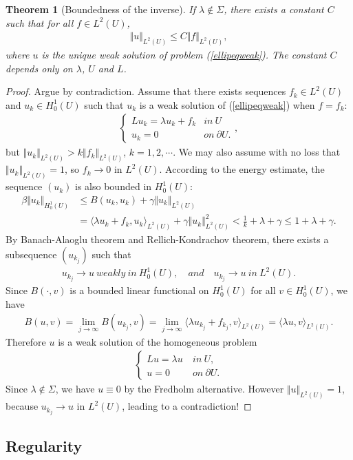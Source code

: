 \documentclass{article}
\numberwithin{equation}{section}
\theoremstyle{plain}
\newtheorem{theorem}{Theorem}[section]
\theoremstyle{definition}
\begin{document}
\begin{theorem}[Boundedness of the inverse]
If $\lambda\notin\Sigma$, there exists a constant $C$ such that for all $f\in L^2(U)$,
\begin{align*}
	\Vert u\Vert_{L^2(U)}\leq C\Vert f\Vert_{L^2(U)},
\end{align*}
where $u$ is the unique weak solution of problem (\ref{ellipeqweak}). The constant $C$ depends only on $\lambda$, $U$ and $L$.
\end{theorem}
\begin{proof}
Argue by contradiction. Assume that there exists sequences $f_k\in L^2(U)$ and $u_k\in H_0^1(U)$ such that $u_k$ is a weak solution of (\ref{ellipeqweak}) when $f=f_k$:
\begin{align*}
	\begin{cases}
		Lu_k=\lambda u_k+f_k & in\ U\\
		u_k=0 & on\ \partial U.
	\end{cases},
\end{align*}
but $\Vert u_k\Vert_{L^2(U)}>k\Vert f_k\Vert_{L^2(U)}$, $k=1,2,\cdots$. We may also assume with no loss that $\Vert u_k\Vert_{L^2(U)}=1$, so $f_k\to 0$ in $L^2(U)$. According to the energy estimate, the sequence $(u_k)$ is also bounded in $H_0^1(U)$:
\begin{align*}
	\beta\Vert u_k\Vert_{H_0^1(U)}&\leq B(u_k,u_k)+\gamma\Vert u_k\Vert_{L^2(U)}\\
	&=\langle \lambda u_k+f_k,u_k\rangle_{L^2(U)}+\gamma\Vert u_k\Vert_{L^2(U)}^2<\frac{1}{k}+\lambda+\gamma\leq 1+\lambda+\gamma.
\end{align*}
By Banach-Alaoglu theorem and Rellich-Kondrachov theorem, there exists a subsequence $(u_{k_j})$ such that
\begin{align*}
	u_{k_j}\to u\ weakly\ in\ H_0^1(U),\quad and\quad u_{k_j}\to u\ in\ L^2(U).
\end{align*} 
Since $B(\cdot,v)$ is a bounded linear functional on $H_0^1(U)$ for all $v\in H_0^1(U)$, we have
\begin{align*}
	B(u,v)=\lim_{j\to\infty} B(u_{k_j},v)=\lim_{j\to\infty}\langle\lambda u_{k_j}+f_{k_j},v\rangle_{L^2(U)}=\langle\lambda u,v\rangle_{L^2(U)}.
\end{align*}
Therefore $u$ is a weak solution of the homogeneous problem
\begin{align*}
\begin{cases}
	Lu=\lambda u\ &in\ U,\\
	u=0\ &on\ \partial U.
\end{cases}
\end{align*}
Since $\lambda\notin\Sigma$, we have $u\equiv 0$ by the Fredholm alternative. However $\Vert u\Vert_{L^2(U)}=1$, because $u_{k_j}\to u$ in $L^2(U)$, leading to a contradiction!
\end{proof}

\subsection{Regularity}
\end{document}
